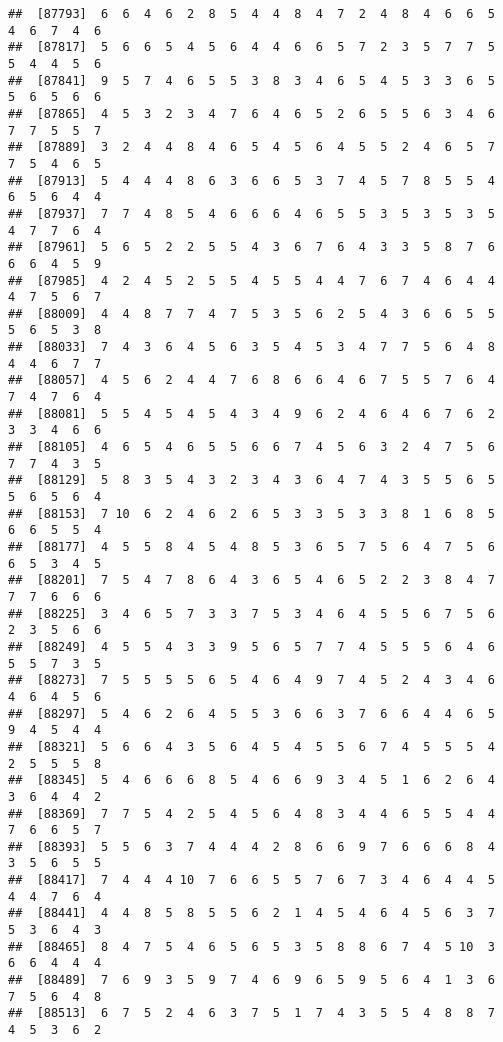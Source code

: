 \documentclass[
]{book}
\begin{document}
\begin{verbatim}
##  [87793]  6  6  4  6  2  8  5  4  4  8  4  7  2  4  8  4  6  6  5  4  6  7  4  6
##  [87817]  5  6  6  5  4  5  6  4  4  6  6  5  7  2  3  5  7  7  5  5  4  4  5  6
##  [87841]  9  5  7  4  6  5  5  3  8  3  4  6  5  4  5  3  3  6  5  5  6  5  6  6
##  [87865]  4  5  3  2  3  4  7  6  4  6  5  2  6  5  5  6  3  4  6  7  7  5  5  7
##  [87889]  3  2  4  4  8  4  6  5  4  5  6  4  5  5  2  4  6  5  7  7  5  4  6  5
##  [87913]  5  4  4  4  8  6  3  6  6  5  3  7  4  5  7  8  5  5  4  6  5  6  4  4
##  [87937]  7  7  4  8  5  4  6  6  6  4  6  5  5  3  5  3  5  3  5  4  7  7  6  4
##  [87961]  5  6  5  2  2  5  5  4  3  6  7  6  4  3  3  5  8  7  6  6  6  4  5  9
##  [87985]  4  2  4  5  2  5  5  4  5  5  4  4  7  6  7  4  6  4  4  4  7  5  6  7
##  [88009]  4  4  8  7  7  4  7  5  3  5  6  2  5  4  3  6  6  5  5  5  6  5  3  8
##  [88033]  7  4  3  6  4  5  6  3  5  4  5  3  4  7  7  5  6  4  8  4  4  6  7  7
##  [88057]  4  5  6  2  4  4  7  6  8  6  6  4  6  7  5  5  7  6  4  7  4  7  6  4
##  [88081]  5  5  4  5  4  5  4  3  4  9  6  2  4  6  4  6  7  6  2  3  3  4  6  6
##  [88105]  4  6  5  4  6  5  5  6  6  7  4  5  6  3  2  4  7  5  6  7  7  4  3  5
##  [88129]  5  8  3  5  4  3  2  3  4  3  6  4  7  4  3  5  5  6  5  5  6  5  6  4
##  [88153]  7 10  6  2  4  6  2  6  5  3  3  5  3  3  8  1  6  8  5  6  6  5  5  4
##  [88177]  4  5  5  8  4  5  4  8  5  3  6  5  7  5  6  4  7  5  6  6  5  3  4  5
##  [88201]  7  5  4  7  8  6  4  3  6  5  4  6  5  2  2  3  8  4  7  7  7  6  6  6
##  [88225]  3  4  6  5  7  3  3  7  5  3  4  6  4  5  5  6  7  5  6  2  3  5  6  6
##  [88249]  4  5  5  4  3  3  9  5  6  5  7  7  4  5  5  5  6  4  6  5  5  7  3  5
##  [88273]  7  5  5  5  5  6  5  4  6  4  9  7  4  5  2  4  3  4  6  4  6  4  5  6
##  [88297]  5  4  6  2  6  4  5  5  3  6  6  3  7  6  6  4  4  6  5  9  4  5  4  4
##  [88321]  5  6  6  4  3  5  6  4  5  4  5  5  6  7  4  5  5  5  4  2  5  5  5  8
##  [88345]  5  4  6  6  6  8  5  4  6  6  9  3  4  5  1  6  2  6  4  3  6  4  4  2
##  [88369]  7  7  5  4  2  5  4  5  6  4  8  3  4  4  6  5  5  4  4  7  6  6  5  7
##  [88393]  5  5  6  3  7  4  4  4  2  8  6  6  9  7  6  6  6  8  4  3  5  6  5  5
##  [88417]  7  4  4  4 10  7  6  6  5  5  7  6  7  3  4  6  4  4  5  4  4  7  6  4
##  [88441]  4  4  8  5  8  5  5  6  2  1  4  5  4  6  4  5  6  3  7  5  3  6  4  3
##  [88465]  8  4  7  5  4  6  5  6  5  3  5  8  8  6  7  4  5 10  3  6  6  4  4  4
##  [88489]  7  6  9  3  5  9  7  4  6  9  6  5  9  5  6  4  1  3  6  7  5  6  4  8
##  [88513]  6  7  5  2  4  6  3  7  5  1  7  4  3  5  5  4  8  8  7  4  5  3  6  2

\end{verbatim}
\end{document}
